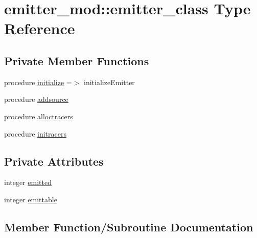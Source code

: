 \hypertarget{structemitter__mod_1_1emitter__class}{}\section{emitter\+\_\+mod\+:\+:emitter\+\_\+class Type Reference}
\label{structemitter__mod_1_1emitter__class}
\subsection*{Private Member Functions}
\begin{DoxyCompactItemize}
\item 
procedure \hyperlink{structemitter__mod_1_1emitter__class_acd215b2680677e298267c5940f0cf79b}{initialize} =$>$ initialize\+Emitter
\item 
procedure \hyperlink{structemitter__mod_1_1emitter__class_a162685b7b0bf96b555fee37e129c9783}{addsource}
\item 
procedure \hyperlink{structemitter__mod_1_1emitter__class_a2e8c9f860c170e5ca3c33e801471c387}{alloctracers}
\item 
procedure \hyperlink{structemitter__mod_1_1emitter__class_a53842af46b11fe923f582487eb26195d}{initracers}
\end{DoxyCompactItemize}
\subsection*{Private Attributes}
\begin{DoxyCompactItemize}
\item 
integer \hyperlink{structemitter__mod_1_1emitter__class_aa8f56d34f32e452a2e78f93f44780b4b}{emitted}
\item 
integer \hyperlink{structemitter__mod_1_1emitter__class_a201a8b070193b7217c5a5c8973d76cd6}{emittable}
\end{DoxyCompactItemize}


\subsection{Member Function/\+Subroutine Documentation}
\mbox{\label{structemitter__mod_1_1emitter__class_a162685b7b0bf96b555fee37e129c9783}} 
